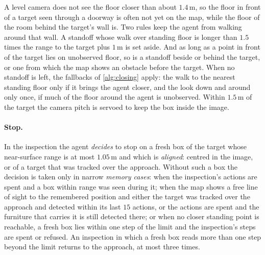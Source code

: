 \documentclass[10pt]{article}
\newcommand{\m}{\,\mathrm{m}}
\begin{document}
A level camera does not see the floor closer than about $1.4\m$, so the floor
in front of a target seen through a doorway is often not yet on the map, while
the floor of the room behind the target's wall is. Two rules keep the agent
from walking around that wall. A standoff whose walk over standing floor is
longer than $1.5$ times the range to the target plus $1\m$ is set aside. And
as long as a point in front of the target lies on unobserved floor, so is a
standoff beside or behind the target, or one from which the map shows an
obstacle before the target. When no standoff is left, the fallbacks of
\cref{alg:closing} apply: the walk to the nearest standing floor only if it
brings the agent closer, and the look down and around only once, if much of
the floor around the agent is unobserved. Within $1.5\m$ of the target the camera pitch is servoed to keep the
box inside the image.

\paragraph{Stop.} In the inspection the agent \emph{decides} to stop on a
fresh box of the target whose near-surface range is at most $1.05\m$ and
which is \emph{aligned}: centred in the image, or of a target that was tracked
over the approach. Without such a box the decision is taken only in narrow
\emph{memory cases}: when the inspection's actions are spent and a box within
range was seen during it; when the map shows a free line of sight to the
remembered position and either the target was tracked over the approach and
detected within its last $15$ actions, or the actions are spent and the
furniture that carries it is still detected there; or when no closer standing
point is reachable, a fresh box lies within one step of the limit and the
inspection's steps are spent or refused. An inspection in which a fresh box
reads more than one step beyond the limit returns to the approach, at most
three times.
\end{document}
